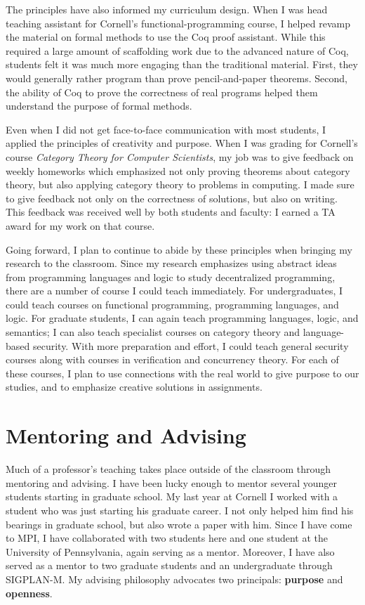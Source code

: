 \documentclass{article}
\theoremstyle{definition}
\begin{document}
The principles have also informed my curriculum design.
When I was head teaching assistant for Cornell's functional-programming course, I helped revamp the material on formal methods to use the Coq proof assistant.
While this required a large amount of scaffolding work due to the advanced nature of Coq, students felt it was much more engaging than the traditional material.
First, they would generally rather program than prove pencil-and-paper theorems.
Second, the ability of Coq to prove the correctness of real programs helped them understand the purpose of formal methods.

Even when I did not get face-to-face communication with most students, I applied the principles of creativity and purpose.
When I was grading for Cornell's course \emph{Category Theory for Computer Scientists}, my job was to give feedback on weekly homeworks which emphasized not only proving theorems about category theory, but also applying category theory to problems in computing.
I made sure to give feedback not only on the correctness of solutions, but also on writing.
This feedback was received well by both students and faculty: I earned a TA award for my work on that course.

Going forward, I plan to continue to abide by these principles when bringing my research to the classroom.
Since my research emphasizes using abstract ideas from programming languages and logic to study decentralized programming, there are a number of course I could teach immediately.
For undergraduates, I could teach courses on functional programming, programming languages, and logic.
For graduate students, I can again teach programming languages, logic, and semantics; I can also teach specialist courses on category theory and language-based security.
With more preparation and effort, I could teach general security courses along with courses in verification and concurrency theory.
For each of these courses, I plan to use connections with the real world to give purpose to our studies, and to emphasize creative solutions in assignments.

\section*{Mentoring and Advising}

Much of a professor's teaching takes place outside of the classroom through mentoring and advising.
I have been lucky enough to mentor several younger students starting in graduate school.
My last year at Cornell I worked with a student who was just starting his graduate career.
I not only helped him find his bearings in graduate school, but also wrote a paper with him.
Since I have come to MPI, I have collaborated with two students here and one student at the University of Pennsylvania, again serving as a mentor.
Moreover, I have also served as a mentor to two graduate students and an undergraduate through SIGPLAN-M.
My advising philosophy advocates two principals: \textbf{purpose} and \textbf{openness}.
\end{document}
